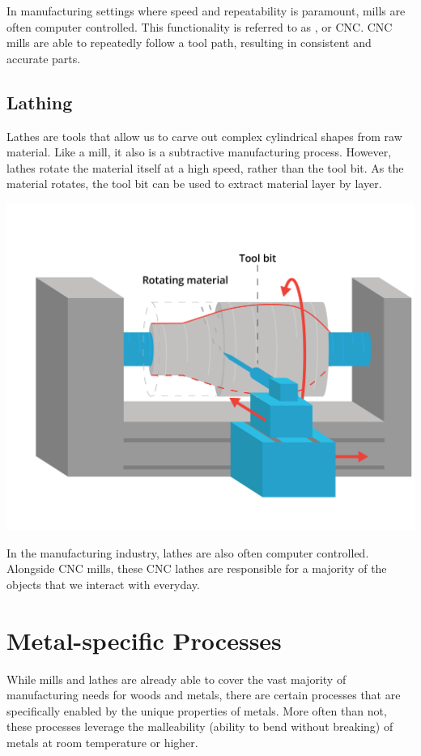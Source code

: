 In manufacturing settings where speed and repeatability is paramount, mills are often computer controlled. This functionality is referred to as , or CNC. CNC mills are able to repeatedly follow a tool path, resulting in consistent and accurate parts.

\subsection{Lathing}

Lathes are tools that allow us to carve out complex cylindrical shapes from raw material. Like a mill, it also is a subtractive manufacturing process. However, lathes rotate the material itself at a high speed, rather than the tool bit. As the material rotates, the tool bit can be used to extract material layer by layer. 

\begin{center}
    
    \includegraphics[width=.75\textwidth]{lathe.png}
\end{center}


In the manufacturing industry, lathes are also often computer controlled. Alongside CNC mills, these CNC lathes are responsible for a majority of the objects that we interact with everyday.

\section{Metal-specific Processes}

While mills and lathes are already able to cover the vast majority of manufacturing needs for woods and metals, there are certain processes that are specifically enabled by the unique properties of metals. More often than not, these processes leverage the malleability (ability to bend without breaking) of metals at room temperature or higher.

